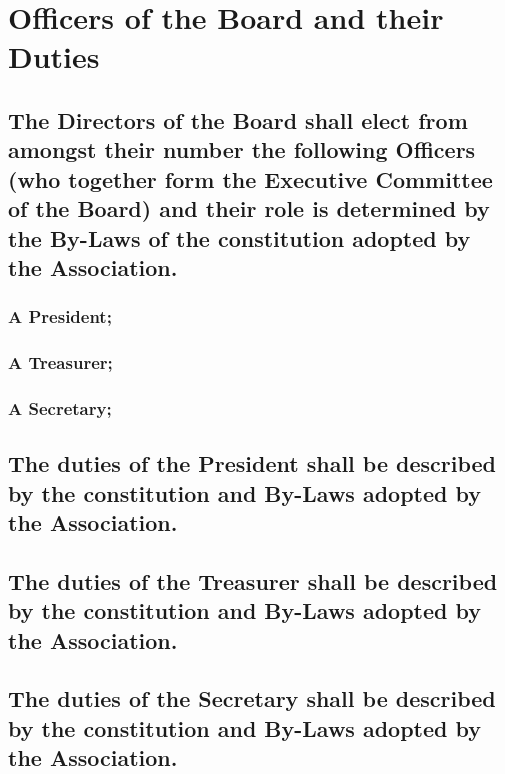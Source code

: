 \documentclass{article}
\newenvironment{subs}
  {\adjustwidth{2em}{0pt}}
  {\endadjustwidth}
\begin{document}
\section{Officers of the Board and their Duties}
\begin{subs}
\subsection{The Directors of the Board shall elect from amongst their number the following Officers (who together form the Executive Committee of the
Board) and their role is determined by the By-Laws of the constitution adopted by the Association.}
\begin{subs}
\subsubsection{A President;}
\subsubsection{A Treasurer;}
\subsubsection{A Secretary;}
\end{subs}
\subsection{The duties of the President shall be described by the constitution and By-Laws adopted by the Association.}
\subsection{The duties of the Treasurer shall be described by the constitution and By-Laws adopted by the Association.}
\subsection{The duties of the Secretary shall be described by the constitution and By-Laws adopted by the Association.}
\end{subs}
\end{document}
